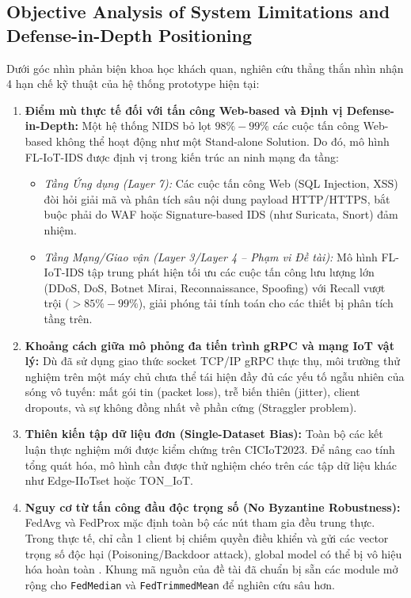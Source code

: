 \subsection{Objective Analysis of System Limitations and Defense-in-Depth Positioning}
\label{sec:res_limitations}
Dưới góc nhìn phản biện khoa học khách quan, nghiên cứu thẳng thắn nhìn nhận 4 hạn chế kỹ thuật của hệ thống prototype hiện tại:
\begin{enumerate}
    \item \textbf{Điểm mù thực tế đối với tấn công Web-based và Định vị Defense-in-Depth:} Một hệ thống NIDS bỏ lọt $98\% - 99\%$ các cuộc tấn công Web-based không thể hoạt động như một Stand-alone Solution. Do đó, mô hình FL-IoT-IDS được định vị trong kiến trúc an ninh mạng đa tầng:
    \begin{itemize}
        \item \textit{Tầng Ứng dụng (Layer 7):} Các cuộc tấn công Web (SQL Injection, XSS) đòi hỏi giải mã và phân tích sâu nội dung payload HTTP/HTTPS, bắt buộc phải do WAF hoặc Signature-based IDS (như Suricata, Snort) đảm nhiệm.
        \item \textit{Tầng Mạng/Giao vận (Layer 3/Layer 4 -- Phạm vi Đề tài):} Mô hình FL-IoT-IDS tập trung phát hiện tối ưu các cuộc tấn công lưu lượng lớn (DDoS, DoS, Botnet Mirai, Reconnaissance, Spoofing) với Recall vượt trội ($>85\% - 99\%$), giải phóng tải tính toán cho các thiết bị phân tích tầng trên.
    \end{itemize}
    \item \textbf{Khoảng cách giữa mô phỏng đa tiến trình gRPC và mạng IoT vật lý:} Dù đã sử dụng giao thức socket TCP/IP gRPC thực thụ, môi trường thử nghiệm trên một máy chủ chưa thể tái hiện đầy đủ các yếu tố ngẫu nhiên của sóng vô tuyến: mất gói tin (packet loss), trễ biến thiên (jitter), client dropouts, và sự không đồng nhất về phần cứng (Straggler problem).
    \item \textbf{Thiên kiến tập dữ liệu đơn (Single-Dataset Bias):} Toàn bộ các kết luận thực nghiệm mới được kiểm chứng trên CICIoT2023. Để nâng cao tính tổng quát hóa, mô hình cần được thử nghiệm chéo trên các tập dữ liệu khác như Edge-IIoTset hoặc TON\_IoT.
    \item \textbf{Nguy cơ từ tấn công đầu độc trọng số (No Byzantine Robustness):} FedAvg và FedProx mặc định toàn bộ các nút tham gia đều trung thực. Trong thực tế, chỉ cần 1 client bị chiếm quyền điều khiển và gửi các vector trọng số độc hại (Poisoning/Backdoor attack), global model có thể bị vô hiệu hóa hoàn toàn \cite{blanchard2017machine, yin2018byzantine}. Khung mã nguồn của đề tài đã chuẩn bị sẵn các module mở rộng cho \texttt{FedMedian} và \texttt{FedTrimmedMean} để nghiên cứu sâu hơn.
\end{enumerate}
